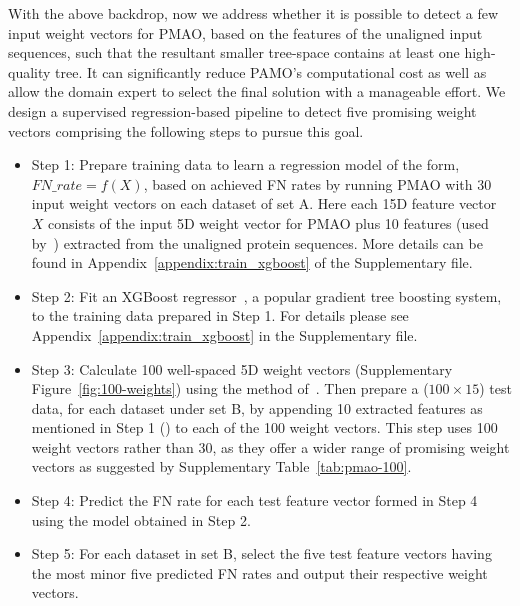 \documentclass[a4paper,fleqn, review]{cas-dc}
\begin{document}
With the above backdrop, now we address whether it is possible to detect a few input weight vectors for PMAO, based on the features of the unaligned input sequences, such that the resultant smaller tree-space contains at least one high-quality tree. It can significantly reduce PAMO's computational cost as well as allow the domain expert to select the final solution with a manageable effort. We design a supervised regression-based pipeline to detect five promising weight vectors comprising the following steps to pursue this goal.
\begin{itemize}
	\item Step 1: Prepare training data to learn a regression model of the form, $FN\_rate = f(X)$, based on achieved FN rates by running PMAO with 30 input weight vectors on each dataset of set A. Here each 15D feature vector $X$ consists of the input 5D weight vector for PMAO plus 10 features (used by~\cite{rubio2018characteristic}) extracted from the unaligned protein sequences. More details can be found in Appendix~\ref{appendix:train_xgboost} of the Supplementary file.
	\item Step 2: Fit an XGBoost regressor~\cite{chen2016xgboost}, a popular gradient tree boosting system, to the training data prepared in Step 1. For details please see Appendix~\ref{appendix:train_xgboost} in the Supplementary file.
\item Step 3: Calculate 100 well-spaced 5D weight vectors (Supplementary Figure~\ref{fig:100-weights}) using the method of~\cite{ref_dirs_energy}. Then prepare a ($100 \times 15$) test data, for each dataset under set B, by appending 10 extracted features as mentioned in Step 1 (\cite{rubio2018characteristic}) to each of the 100 weight vectors. This step uses 100 weight vectors rather than 30, as they offer a wider range of promising weight vectors as suggested by Supplementary Table~\ref{tab:pmao-100}.
	\item Step 4: Predict the FN rate for each test feature vector formed in Step 4 using the model obtained in Step 2.
	\item Step 5: For each dataset in set B, select the five test feature vectors having the most minor five predicted FN rates and output their respective weight vectors.
\end{itemize}
\end{document}
